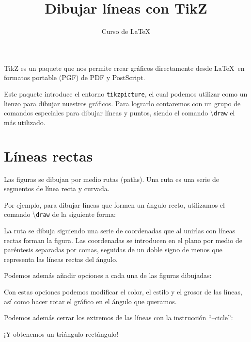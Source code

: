 \documentclass{article}
\title{Dibujar líneas con TikZ}
\author{Curso de \LaTeX}
\begin{document}
\maketitle

TikZ es un paquete que nos permite crear gráficos directamente desde \LaTeX\ en formatos portable (PGF) de PDF y PostScript.

Este paquete introduce el entorno \texttt{tikzpicture}, el cual podemos utilizar como un lienzo para dibujar nuestros gráficos. Para lograrlo contaremos con un grupo de comandos especiales para dibujar líneas y puntos, siendo el comando \textbackslash\texttt{draw} el más utilizado.

\section*{Líneas rectas}

Las figuras se dibujan por medio rutas (paths). Una ruta es una serie de segmentos de línea recta y curvada. 

Por ejemplo, para dibujar líneas que formen un ángulo recto, utilizamos el comando \textbackslash\texttt{draw} de la siguiente forma:


La ruta se dibuja siguiendo una serie de coordenadas que al unirlas con líneas rectas forman la figura. Las coordenadas se introducen en el plano por medio de paréntesis separadas por comas, seguidas de un doble signo de menos que representa las líneas rectas del ángulo. 

Podemos además añadir opciones a cada una de las figuras dibujadas:


Con estas opciones podemos modificar el color, el estilo y el grosor de las líneas, así como hacer rotar el gráfico en el ángulo que queramos.

Podemos además cerrar los extremos de las líneas con la instrucción ``--cicle'':


¡Y obtenemos un triángulo rectángulo!
\end{document}
